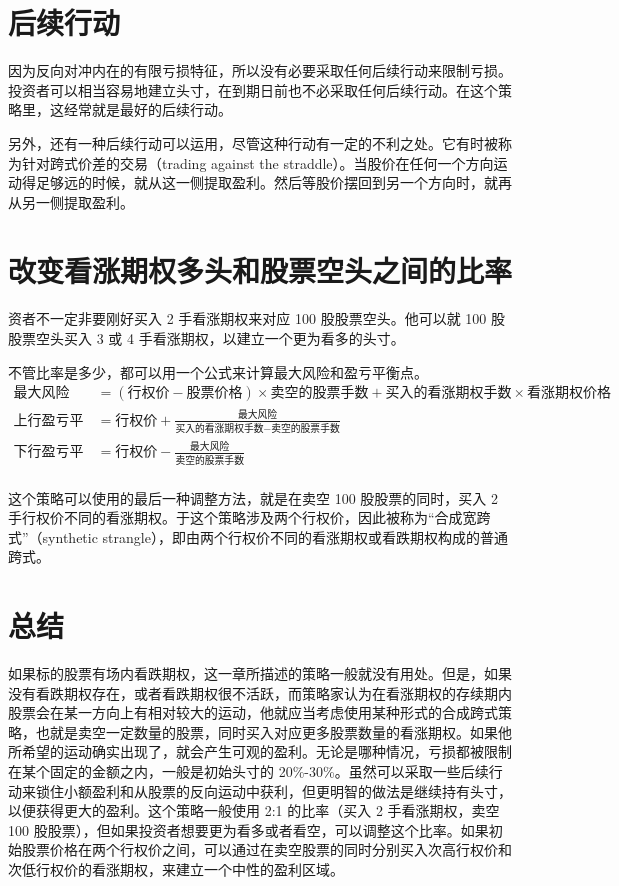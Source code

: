 \section{后续行动}
因为反向对冲内在的有限亏损特征，所以没有必要采取任何后续行动来限制亏损。投资者可以相当容易地建立头寸，在到期日前也不必采取任何后续行动。在这个策略里，这经常就是最好的后续行动。

另外，还有一种后续行动可以运用，尽管这种行动有一定的不利之处。它有时被称为针对跨式价差的交易（trading against the straddle）。当股价在任何一个方向运动得足够远的时候，就从这一侧提取盈利。然后等股价摆回到另一个方向时，就再从另一侧提取盈利。
\section{改变看涨期权多头和股票空头之间的比率}
资者不一定非要刚好买入 2 手看涨期权来对应 100 股股票空头。他可以就 100 股股票空头买入 3 或 4 手看涨期权，以建立一个更为看多的头寸。

不管比率是多少，都可以用一个公式来计算最大风险和盈亏平衡点。
\begin{equation}
    \begin{aligned}
        \text{最大风险}    & =(\text{行权价}-\text{股票价格})\times \text{卖空的股票手数}+\text{买入的看涨期权手数}\times \text{看涨期权价格} \\
        \text{上行盈亏平衡点} & =\text{行权价}+\frac{\text{最大风险}}{\text{买入的看涨期权手数}-\text{卖空的股票手数}}                     \\
        \text{下行盈亏平衡点} & =\text{行权价}-\frac{\text{最大风险}}{\text{卖空的股票手数}}                                      \\
    \end{aligned}
\end{equation}

这个策略可以使用的最后一种调整方法，就是在卖空 100 股股票的同时，买入 2 手行权价不同的看涨期权。于这个策略涉及两个行权价，因此被称为“合成宽跨式”（synthetic strangle），即由两个行权价不同的看涨期权或看跌期权构成的普通跨式。
\section{总结}
如果标的股票有场内看跌期权，这一章所描述的策略一般就没有用处。但是，如果没有看跌期权存在，或者看跌期权很不活跃，而策略家认为在看涨期权的存续期内股票会在某一方向上有相对较大的运动，他就应当考虑使用某种形式的合成跨式策略，也就是卖空一定数量的股票，同时买入对应更多股票数量的看涨期权。如果他所希望的运动确实出现了，就会产生可观的盈利。无论是哪种情况，亏损都被限制在某个固定的金额之内，一般是初始头寸的 20\%-30\%。虽然可以采取一些后续行动来锁住小额盈利和从股票的反向运动中获利，但更明智的做法是继续持有头寸，以便获得更大的盈利。这个策略一般使用 2:1 的比率（买入 2 手看涨期权，卖空 100 股股票），但如果投资者想要更为看多或者看空，可以调整这个比率。如果初始股票价格在两个行权价之间，可以通过在卖空股票的同时分别买入次高行权价和次低行权价的看涨期权，来建立一个中性的盈利区域。